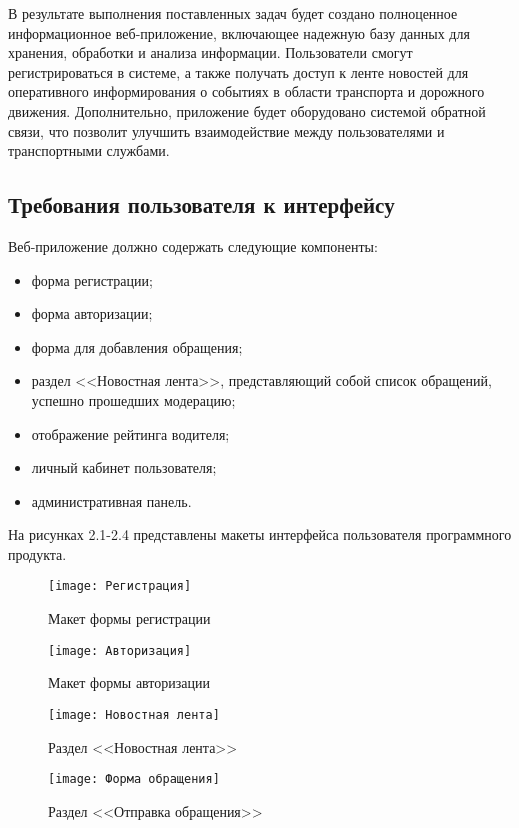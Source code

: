 В результате выполнения поставленных задач будет создано полноценное информационное веб-приложение, включающее надежную базу данных для хранения, обработки и анализа информации. Пользователи смогут регистрироваться в системе, а также получать доступ к ленте новостей для оперативного информирования о событиях в области транспорта и дорожного движения. Дополнительно, приложение будет оборудовано системой обратной связи, что позволит улучшить взаимодействие между пользователями и транспортными службами.

\subsection{Требования пользователя к интерфейсу}

Веб-приложение должно содержать следующие компоненты:
\begin{itemize}
	\item форма регистрации;
	\item форма авторизации;
	\item форма для добавления обращения;
	\item раздел <<Новостная лента>>, представляющий собой список обращений, успешно прошедших модерацию;
	\item отображение рейтинга водителя;
	\item личный кабинет пользователя;
	\item административная панель.
\end{itemize}

На рисунках 2.1-2.4 представлены макеты интерфейса пользователя программного продукта.
\begin{figure}[H]
	\texttt{[image: Регистрация]}
	\caption{Макет формы регистрации}
	\label{templ:image1}
\end{figure}

\begin{figure}[H]
	\texttt{[image: Авторизация]}
	\caption{Макет формы авторизации}
	\label{templ:image2}
\end{figure}

\begin{figure}[H]
	\texttt{[image: Новостная лента]}
	\caption{Раздел <<Новостная лента>>}
	\label{templ:image3}
\end{figure}

\begin{figure}[H]
	\texttt{[image: Форма обращения]}
	\caption{Раздел <<Отправка обращения>>}
	\label{templ:image4}
\end{figure}

